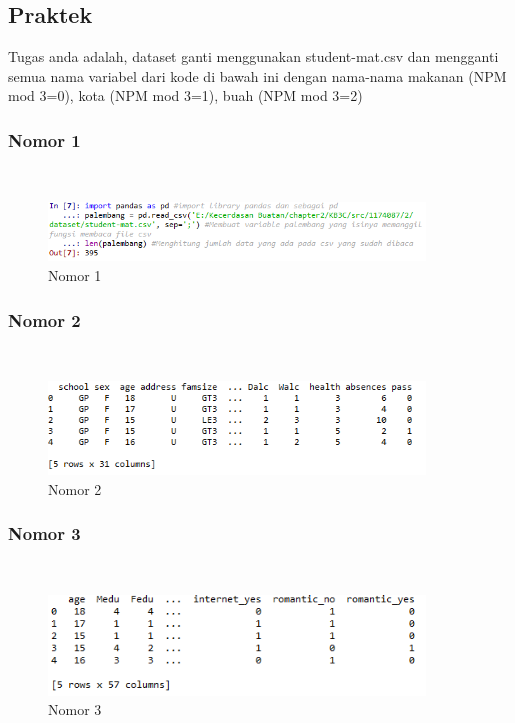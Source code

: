 \subsection{Praktek}
Tugas anda adalah, dataset ganti menggunakan student-mat.csv dan mengganti semua nama variabel dari kode di bawah ini dengan nama-nama makanan (NPM mod 3=0), kota (NPM mod 3=1), buah (NPM mod 3=2)
 

\subsubsection{Nomor 1}
\hfill\\

\begin{figure}[H]
\centerline{\includegraphics[width=10cm]{figures/1174087/2/p1.png}}
\caption{Nomor 1}
\label{labelgambar}
\end{figure}

\subsubsection{Nomor 2}
\hfill\\

\begin{figure}[H]
\centerline{\includegraphics[width=10cm]{figures/1174087/2/p2.png}}
\caption{Nomor 2}
\label{labelgambar}
\end{figure}

\subsubsection{Nomor 3}
\hfill\\

\begin{figure}[H]
\centerline{\includegraphics[width=10cm]{figures/1174087/2/p3.png}}
\caption{Nomor 3}
\label{labelgambar}
\end{figure}

